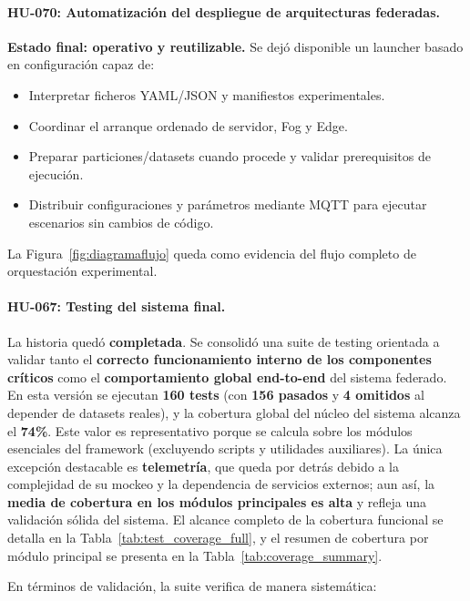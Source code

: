 \documentclass{report}
\begin{document}
\vspace{0.15em}
\paragraph{HU-070: Automatización del despliegue de arquitecturas federadas.}
\textbf{Estado final: operativo y reutilizable.} Se dejó disponible un launcher basado en configuración capaz de:
\begin{itemize}\setlength\itemsep{0.15em}
    \item Interpretar ficheros YAML/JSON y manifiestos experimentales.
    \item Coordinar el arranque ordenado de servidor, Fog y Edge.
    \item Preparar particiones/datasets cuando procede y validar prerequisitos de ejecución.
    \item Distribuir configuraciones y parámetros mediante MQTT para ejecutar escenarios sin cambios de código.
\end{itemize}
La Figura~\ref{fig:diagramaflujo} queda como evidencia del flujo completo de orquestación experimental.

\vspace{0.15em}
\paragraph{HU-067: Testing del sistema final.}
La historia quedó \textbf{completada}. Se consolidó una suite de testing orientada a validar tanto el \textbf{correcto funcionamiento interno de los componentes críticos} como el \textbf{comportamiento global end-to-end} del sistema federado. En esta versión se ejecutan \textbf{160 tests} (con \textbf{156 pasados} y \textbf{4 omitidos} al depender de datasets reales), y la cobertura global del núcleo del sistema alcanza el \textbf{74\%}. Este valor es representativo porque se calcula sobre los módulos esenciales del framework (excluyendo scripts y utilidades auxiliares). La única excepción destacable es \textbf{telemetría}, que queda por detrás debido a la complejidad de su mockeo y la dependencia de servicios externos; aun así, la \textbf{media de cobertura en los módulos principales es alta} y refleja una validación sólida del sistema. El alcance completo de la cobertura funcional se detalla en la Tabla~\ref{tab:test_coverage_full}, y el resumen de cobertura por módulo principal se presenta en la Tabla~\ref{tab:coverage_summary}.

En términos de validación, la suite verifica de manera sistemática:
\end{document}
